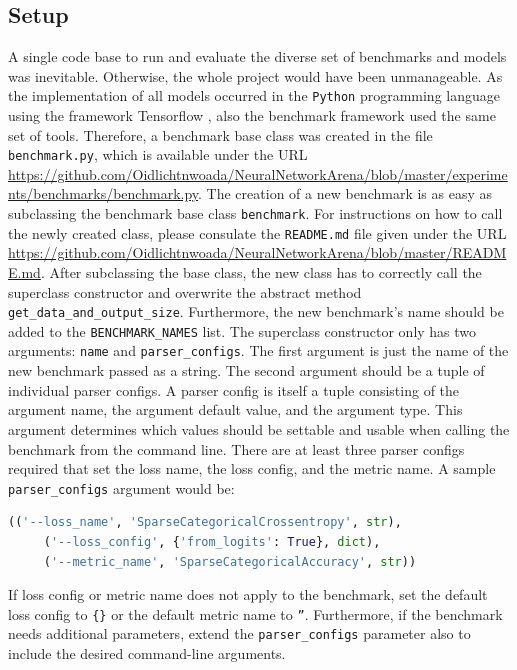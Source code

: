 \documentclass[draft,final]{vutinfth} %
\begin{document}
    \subsection{Setup} \label{benchmark_setup}
    A single code base to run and evaluate the diverse set of benchmarks and models was inevitable.
    Otherwise, the whole project would have been unmanageable.
    As the implementation of all models occurred in the \texttt{Python} programming language \cite{Python3} using the framework Tensorflow \cite{Tensorflow}, also the benchmark framework used the same set of tools.
    Therefore, a benchmark base class was created in the file \texttt{benchmark.py}, which is available under the URL \url{https://github.com/Oidlichtnwoada/NeuralNetworkArena/blob/master/experiments/benchmarks/benchmark.py}.
    The creation of a new benchmark is as easy as subclassing the benchmark base class \texttt{benchmark}.
    For instructions on how to call the newly created class, please consulate the \texttt{README.md} file given under the URL \url{https://github.com/Oidlichtnwoada/NeuralNetworkArena/blob/master/README.md}.
    After subclassing the base class, the new class has to correctly call the superclass constructor and overwrite the abstract method \texttt{get\_data\_and\_output\_size}.
    Furthermore, the new benchmark's name should be added to the \texttt{BENCHMARK\_NAMES} list.
    The superclass constructor only has two arguments: \texttt{name} and \texttt{parser\_configs}.
    The first argument is just the name of the new benchmark passed as a string.
    The second argument should be a tuple of individual parser configs.
    A parser config is itself a tuple consisting of the argument name, the argument default value, and the argument type.
    This argument determines which values should be settable and usable when calling the benchmark from the command line.
    There are at least three parser configs required that set the loss name, the loss config, and the metric name.
    A sample \texttt{parser\_configs} argument would be:
    \begin{lstlisting}[language=Python]
    (('--loss_name', 'SparseCategoricalCrossentropy', str), 
     ('--loss_config', {'from_logits': True}, dict), 
     ('--metric_name', 'SparseCategoricalAccuracy', str))
    \end{lstlisting}
    If loss config or metric name does not apply to the benchmark, set the default loss config to \texttt{\{\}} or the default metric name to \texttt{''}.
    Furthermore, if the benchmark needs additional parameters, extend the \texttt{parser\_configs} parameter also to include the desired command-line arguments.
\end{document}
